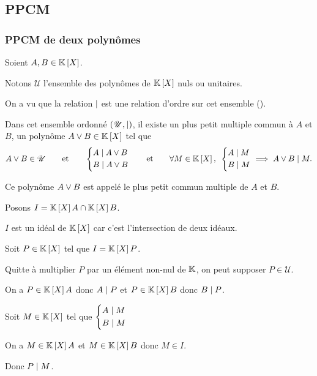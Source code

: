 \subsection{PPCM}

\subsubsection{PPCM de deux polynômes}

\begin{defprop}
\renewcommand{\U}{\mathscr{U}}
Soient \(A,B\in\poly\).

Notons \(\U\) l'ensemble des polynômes de \(\poly\) nuls ou unitaires.

On a vu que la relation \(\mid\) est une relation d'ordre sur cet ensemble (\cf {}).

Dans cet ensemble ordonné \(\groupe{\U}[\divise]\), il existe un plus petit multiple commun à \(A\) et \(B\), \cad un polynôme \(A\ou B\in\poly\) tel que \[A\ou B\in\U\qquad\text{et}\qquad\begin{dcases}A\divise A\ou B \\ B\divise A\ou B\end{dcases}\qquad\text{et}\qquad\quantifs{\forall M\in\poly}\begin{dcases}A\divise M \\ B\divise M\end{dcases}\imp A\ou B\divise M.\]

Ce polynôme \(A\lor B\) est appelé le plus petit commun multiple de \(A\) et \(B\).
\end{defprop}

\begin{dem}
\renewcommand{\U}{\mathscr{U}}
Posons \(I=\poly A\inter\poly B\).

\(I\) est un idéal de \(\poly\) car c'est l'intersection de deux idéaux.

Soit \(P\in\poly\) tel que \(I=\poly P\).

Quitte à multiplier \(P\) par un élément non-nul de \(\mathbb{K}\), on peut supposer \(P\in\U\).

On a \(P\in\poly A\) donc \(A\mid P\) et \(P\in\poly B\) donc \(B\mid P\).

Soit \(M\in\poly\) tel que \(\begin{dcases}A\mid M \\ B\mid M\end{dcases}\)

On a \(M\in\poly A\) et \(M\in\poly B\) donc \(M\in I\).

Donc \(P\mid M\).
\end{dem}


